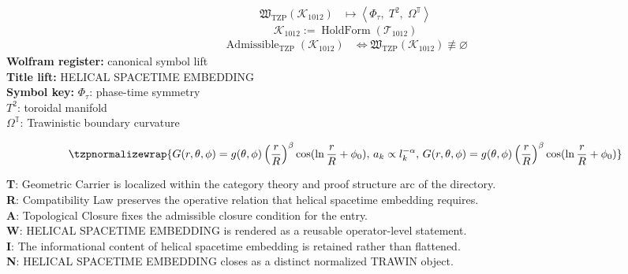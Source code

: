 \noindent
\begin{minipage}[t]{0.48\linewidth}
\begingroup
\small
\[
\begin{aligned}
\mathfrak{W}_{\mathrm{TZP}}\!\left(\mathcal{K}_{1012}\right)
&\longmapsto
\left\langle \Phi_{\tau},\; T^{2},\; \Omega^{\mathbb{T}} \right\rangle
\end{aligned}
\]
\[
\mathcal{K}_{1012}
:=
\operatorname{HoldForm}\!\left(\mathcal{T}_{1012}\right)
\]
\[
\begin{aligned}
\operatorname{Admissible}_{\mathrm{TZP}}\!\left(\mathcal{K}_{1012}\right)
&\Longleftrightarrow
\mathfrak{W}_{\mathrm{TZP}}\!\left(\mathcal{K}_{1012}\right)\not\equiv\varnothing
\end{aligned}
\]
\textbf{Wolfram register:} canonical symbol lift\\
\textbf{Title lift:} HELICAL SPACETIME EMBEDDING\\
\textbf{Symbol key:} \(\Phi_{\tau}\): phase-time symmetry\\ \(T^{2}\): toroidal manifold\\ \(\Omega^{\mathbb{T}}\): Trawinistic boundary curvature
\par
\endgroup
\end{minipage}\hfill
\begin{minipage}[t]{0.48\linewidth}
\[
\tzpnormalizewrap{G(r, \theta, \phi) = g(\theta, \phi) \left(\frac{r}{R}\right)^\beta \cos(\ln \frac{r}{R} + \phi_0),\,a_k \propto l_k^{-\alpha},\,G(r, \theta, \phi) = g(\theta, \phi) \left(\frac{r}{R}\right)^\beta \cos(\ln \frac{r}{R} + \phi_0)}
\]

\small
\textbf{T}: Geometric Carrier is localized within the category theory and proof structure arc of the directory.\\
\textbf{R}: Compatibility Law preserves the operative relation that helical spacetime embedding requires.\\
\textbf{A}: Topological Closure fixes the admissible closure condition for the entry.\\
\textbf{W}: HELICAL SPACETIME EMBEDDING is rendered as a reusable operator-level statement.\\
\textbf{I}: The informational content of helical spacetime embedding is retained rather than flattened.\\
\textbf{N}: HELICAL SPACETIME EMBEDDING closes as a distinct normalized TRAWIN object.
\normalsize
\end{minipage}

